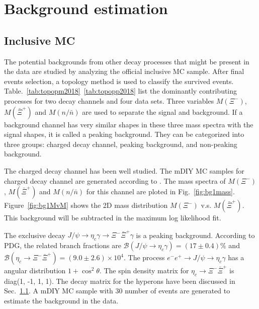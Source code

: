 \section{Background estimation}
\label{sec:background}
\subsection{Inclusive MC}
The potential backgrounds from other decay processes that might be present
in the data are studied by analyzing the official inclusive MC sample.
After final events selection, a topology method is used to classify the 
survived events. Table.~\ref{tab:topopm2018}~\ref{tab:topopp2018} list the 
dominantly contributing processes
for two decay channels and four data sets. Three variables $M(\Xi^-)$,
$M(\bar{\Xi}^+)$ and $M(n/\bar{n})$ are used to separate the signal 
and background. If a background channel has very similar shapes in these 
three mass spectra with the signal shapes, it is called a peaking background.
They can be categorized into three groups: charged decay channel, 
peaking background, and non-peaking background.


The charged decay channel has been well studied. The mDIY MC samples for 
charged decay channel are generated according to \cite{}. The mass spectra
of $M(\Xi^-)$, $M(\bar{\Xi}^+)$ and $M(n/\bar{n})$ for this channel are 
ploted in Fig.~\ref{fig:bg1mass}. Figure~\ref{fig:bg1MvM} shows the 2D 
mass distribution $M(\Xi^-)$ v.s. $M(\bar{\Xi}^+)$.
This background will be subtracted in the maximum 
log likelihood fit. 




The exclusive decay $J/\psi \to \eta_c\gamma \to\Xi^- \bar{\Xi}^+\gamma$
is a peaking background. According to PDG, the related  branch fractions 
are $\mathcal{B}(J/\psi \to \eta_c\gamma) = (17\pm0.4)\%$ and
$\mathcal{B}(\eta_c \to \Xi^- \bar{\Xi}^+) = (9.0\pm2.6)\times10^4$.
The process $e^-e^+ \to J/\psi \to \eta_c\gamma$ has a angular distribution
$1+\cos^2\theta$. The spin density matrix for $\eta_c \to \Xi^- \bar{\Xi}^+$
is diag(1, -1, 1, 1). The decay matrix for the hyperons have been discussed 
in Sec.~\ref{}. A mDIY MC sample with 30 number of events are 
generated to estimate the background in the data.

